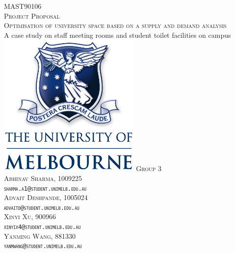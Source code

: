 \begin{titlepage}
\center %
 
\vfill
\textsc{\large{MAST90106} \\[1cm]
\large{Project Proposal} \\[0.2cm]\LARGE{Optimisation of university space based on a supply and demand analysis}}
\\
\large{A case study on staff meeting rooms and student toilet facilities on campus}
\vfill
\includegraphics[width=7cm]{resources/images/unimelblogo.png}
\vfill
\textsc{\LARGE{Group 3}}
\vspace{5mm}\\
\textsc{ Abhinav Sharma, 1009225\\
    \texttt{sharma.a1@student.unimelb.edu.au} }\\
    \vspace{5mm}
\textsc{ Advait Deshpande, 1005024\\
    \texttt{advaitd@student.unimelb.edu.au}}\\
    \vspace{5mm}
\textsc{ Xinyi Xu, 900966\\
    \texttt{xinyix4@student.unimelb.edu.au}}\\
    \vspace{5mm}
\textsc{ Yanming Wang, 881330\\
    \texttt{yanmwang@student.unimelb.edu.au}}
\end{titlepage}